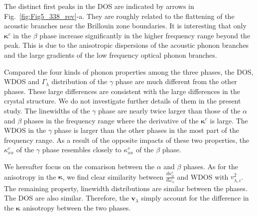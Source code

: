 \documentclass[twocolumn,amsmath,amssymb,a4paper,prb,superscriptaddress,floatfix]{revtex4-1}
\begin{document}
The distinct first peaks in the DOS are indicated by arrows in
Fig.~\ref{fig:Fig5_338_rev}-a. They are roughly  related to the flattening of
the acoustic branches near the Brillouin zone boundaries. It is interesting that
only $\boldsymbol{\kappa}^c$ in the $\beta$ phase increase significantly in the
higher frequency range beyond the peak. This is due to the anisotropic dispersions of
the acoustic phonon branches and the large gradients of the low frequency
optical phonon branches.

Compared the four kinds of phonon properties among the three phases, the DOS,
WDOS and $\Gamma_\lambda$ distribution of the $\gamma$ phase are much different
from the other phases. These large differences are consistent with the large
differences in the crystal structure. We do not investigate further details of
them in the present study.  The linewidths of the $\gamma$ phase are nearly
twice larger than those of the $\alpha$ and $\beta$ phases in the frequency
range where the derivative of the $\boldsymbol{\kappa}^c$ is large.  The WDOS in
the $\gamma$ phase is larger than the other phases in the most part of the
frequency range. As a result of the opposite impacts of these two properties,
the $\kappa^c_{xx}$ of the $\gamma$ phase resembles closely to $\kappa^c_{xx}$
of the $\beta$ phase. 


We hereafter focus on the comarison between the $\alpha$ and $\beta$ phases. As
for the anisotropy in the $\boldsymbol{\kappa}$, we find clear similarity
between $\frac{d\kappa^c_{ii}}{d\omega_\lambda}$ and WDOS with
$v^2_{\lambda,i}$. The remaining property, linewidth distributions are similar
between the phases. The DOS are also similar. Therefore, the
$\mathbf{v}_\lambda$ simply account for the difference in the
$\boldsymbol{\kappa}$ anisotropy between the two phases.  
\end{document}
